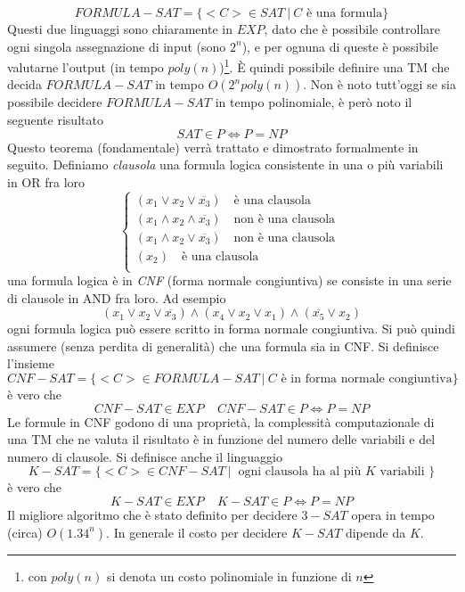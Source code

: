 \documentclass[10pt, letterpaper]{report}
\begin{document}
$$ FORMULA-SAT = \{<C>\in SAT \ | \ C \text{ è una formula}\}$$
Questi due linguaggi sono chiaramente in $EXP$, dato che è possibile controllare ogni singola assegnazione di input (sono $2^n$), e per ognuna di queste è possibile valutarne l'output (in tempo $poly(n)$)\footnote{con $poly(n)$ si denota un costo polinomiale in funzione di $n$}. È quindi possibile definire una TM che decida $ FORMULA-SAT$ in tempo $O(2^npoly(n))$. \acc Non è noto tutt'oggi se sia possibile decidere $FORMULA-SAT$ in tempo polinomiale, è però noto il seguente risultato 
$$ SAT \in P \iff P=NP$$
Questo teorema (fondamentale) verrà trattato e dimostrato formalmente in seguito.\acc 
Definiamo \textit{clausola} una formula logica consistente in una o più variabili in OR fra loro $$ \begin{cases}
    (x_1 \lor x_2 \lor \overline{x_3}) \ \ \ \text{ è una clausola }\\ 
    (x_1 \land x_2 \land \overline{x_3})\ \ \ \text{ non è una clausola }\\ 
    (x_1 \land x_2 \lor \overline{x_3}) \ \ \ \text{ non è una clausola }\\ 
    ( x_2) \ \ \ \text{ è una clausola }\\ 
\end{cases}$$
 una formula logica è in \textit{CNF} (forma normale congiuntiva) se consiste in una serie di clausole in AND fra loro. Ad esempio  
$$ (x_1 \lor x_2 \lor \overline{x_3}) \land (x_4 \lor x_2 \lor {x_1}) \land  
(\overline{x_5} \lor x_2)$$
\prop{} ogni formula logica può essere scritto in forma normale congiuntiva. Si può quindi assumere (senza perdita di generalità) che una formula sia in CNF.\acc 
Si definisce l'insieme 
$$ CNF-SAT=\{<C>\in FORMULA-SAT \ | \ C \text{ è in forma normale congiuntiva}\}$$
è vero che 
$$ CNF-SAT \in EXP \ \ \ \ \ CNF-SAT \in P \iff P=NP$$
Le formule in CNF godono di una proprietà, la complessità computazionale di una TM che ne valuta il risultato è in funzione del numero delle variabili e del numero di clausole.\acc 
Si definisce anche il linguaggio 
$$ K-SAT = \{<C>\in CNF-SAT \ | \ \text{ ogni clausola ha al più }K\text{ variabili } \}$$è vero che 
$$ K-SAT \in EXP \ \ \ \ \ K-SAT \in P \iff P=NP$$
Il migliore algoritmo che è stato definito per decidere $3-SAT$ opera in tempo (circa) $O(1.34^n)$. In generale il costo per decidere $K-SAT$ dipende da $K$. \acc 
\end{document}
